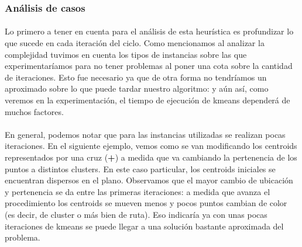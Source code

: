 \subsubsection{Análisis de casos}
\paragraph{}
Lo primero a tener en cuenta para el análisis de esta heurística es profundizar lo que sucede en cada iteración del ciclo. Como mencionamos al analizar la complejidad tuvimos en cuenta los tipos de instancias sobre las que experimentaríamos para no tener problemas al poner una cota sobre la cantidad de iteraciones. Esto fue necesario ya que de otra forma no tendríamos un aproximado sobre lo que puede tardar nuestro algoritmo: y aún así, como veremos en la experimentación, el tiempo de ejecución de kmeans dependerá de muchos factores.
\paragraph{}
En general, podemos notar que para las instancias utilizadas se realizan pocas iteraciones. En el siguiente ejemplo, vemos como se van modificando los centroids representados por una cruz (\textbf{+}) a medida que va cambiando la pertenencia de los puntos a distintos clusters. En este caso particular, los centroids iniciales se encuentran dispersos en el plano. Observamos que el mayor cambio de ubicación y pertenencia se da entre las primeras iteraciones: a medida que avanza el procedimiento los centroids se mueven menos y pocos puntos cambian de color (es decir, de cluster o más bien de ruta). Eso indicaría ya con unas pocas iteraciones de kmeans se puede llegar a una solución bastante aproximada del problema. 
